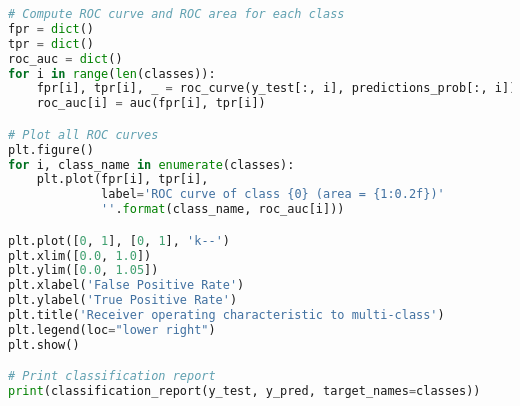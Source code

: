 \begin{lstlisting}[language=Python]
# Compute ROC curve and ROC area for each class
fpr = dict()
tpr = dict()
roc_auc = dict()
for i in range(len(classes)):
    fpr[i], tpr[i], _ = roc_curve(y_test[:, i], predictions_prob[:, i])
    roc_auc[i] = auc(fpr[i], tpr[i])

# Plot all ROC curves
plt.figure()
for i, class_name in enumerate(classes):
    plt.plot(fpr[i], tpr[i],
             label='ROC curve of class {0} (area = {1:0.2f})'
             ''.format(class_name, roc_auc[i]))

plt.plot([0, 1], [0, 1], 'k--')
plt.xlim([0.0, 1.0])
plt.ylim([0.0, 1.05])
plt.xlabel('False Positive Rate')
plt.ylabel('True Positive Rate')
plt.title('Receiver operating characteristic to multi-class')
plt.legend(loc="lower right")
plt.show()

# Print classification report
print(classification_report(y_test, y_pred, target_names=classes))


\end{lstlisting}
